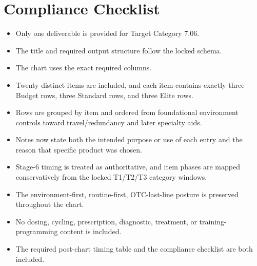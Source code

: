 \documentclass[10pt]{article}
\begin{document}
\section*{Compliance Checklist}
{}

\begin{itemize}
\item Only one deliverable is provided for Target Category 7.06.
\item The title and required output structure follow the locked schema.
\item The chart uses the exact required columns.
\item Twenty distinct items are included, and each item contains exactly three Budget rows, three Standard rows, and three Elite rows.
\item Rows are grouped by item and ordered from foundational environment controls toward travel/redundancy and later specialty aids.
\item Notes now state both the intended purpose or use of each entry and the reason that specific product was chosen.
\item Stage-6 timing is treated as authoritative, and item phases are mapped conservatively from the locked T1/T2/T3 category windows.
\item The environment-first, routine-first, OTC-last-line posture is preserved throughout the chart.
\item No dosing, cycling, prescription, diagnostic, treatment, or training-programming content is included.
\item The required post-chart timing table and the compliance checklist are both included.
\end{itemize}
\end{document}
